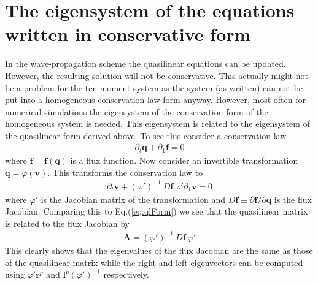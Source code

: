 \documentclass[11pt, reqno]{amsart}
\newcommand{\eqr}[1]{Eq.\thinspace(#1)}
\newcommand{\mvec}[1]{\mathbf{#1}}
\theoremstyle{definition}
\begin{document}
\section{The eigensystem of the equations written in conservative form}

In the wave-propagation scheme the quasilinear equations can be
updated. However, the resulting solution will not be
conservative. This actually might not be a problem for the ten-moment
system as the system (as written) can not be put into a homogeneous
conservation law form anyway. However, most often for numerical
simulations the eigensystem of the conservation form of the homogeneous
system is needed. This eigensystem is related to the eigensystem of
the quasilinear form derived above. To see this consider a
conservation law
\begin{align}
  \partial_t \mvec{q} + \partial_1 \mvec{f} = 0
\end{align}
where $\mvec{f} = \mvec{f}(\mvec{q})$ is a flux function. Now consider
an invertible transformation $\mvec{q} = \varphi(\mvec{v})$. This
transforms the conservation law to
\begin{align}
  \partial_t \mvec{v} 
  + (\varphi')^{-1}\ D\mvec{f}\ \varphi' \partial_1 \mvec{v} = 0
\end{align}
where $\varphi'$ is the Jacobian matrix of the transformation and
$D\mvec{f} \equiv \partial \mvec{f}/\partial \mvec{q}$ is the flux
Jacobian. Comparing this to \eqr{\ref{eq:qlForm}} we see that the
quasilinear matrix is related to the flux Jacobian by
\begin{align}
  \mvec{A} = (\varphi')^{-1}\ D\mvec{f}\ \varphi'
\end{align}
This clearly shows that the eigenvalues of the flux Jacobian are the
same as those of the quasilinear matrix while the right and left
eigenvectors can be computed using $\varphi' \mvec{r}^p$ and
$\mvec{l}^p(\varphi')^{-1} $ respectively.
\end{document}
